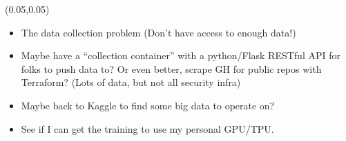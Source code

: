 \documentclass[aspectratio=169]{beamer} %
\begin{document}
\begin{frame}{}
    \setlength{\TPHorizModule}{\textwidth}
    \setlength{\TPVertModule}{\textwidth}
    \begin{textblock}{0.74}(0.05,0.05)
        \bfseries\large\textcolor{white}{Next Steps for this Project}
    \end{textblock}
    \begin{itemize}
        \item The data collection problem (Don't have access to enough data!)
        \item Maybe have a ``collection container'' with a python/Flask RESTful API for folks to push data to? Or even better, scrape GH for public repos with Terraform? (Lots of data, but not all security infra)
        \item Maybe back to Kaggle to find some big data to operate on?
        \item See if I can get the training to use my personal GPU/TPU.
    \end{itemize}
\end{frame}

\end{document}
